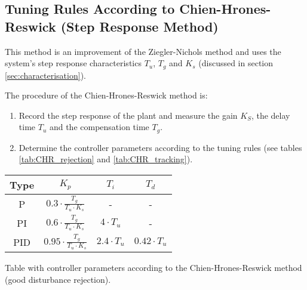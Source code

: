 \subsection{Tuning Rules According to Chien-Hrones-Reswick (Step Response Method)}

This  method is an improvement of the  Ziegler-Nichols  method  and  uses  the
system's step response characteristics $T_u$, $T_g$ and  $K_s$  (discussed  in
section \ref{sec:characterisation}).

The procedure of the Chien-Hrones-Reswick method is:

\begin{enumerate}
    \item Record the step response of the plant and measure the gain $K_{S}$, the delay time $T_{u}$ and the compensation time $T_{g}$.
    \item Determine the controller parameters according to the tuning rules (see tables \ref{tab:CHR_rejection} and \ref{tab:CHR_tracking}).
\end{enumerate}

\begin{center}
    \begin{threeparttable}
        \begin{tabular}{cccc}
            \toprule
            Type & $K_p$                                    &  $T_{i}$            &  $T_{d}$ \\
            \midrule
            P    &  $0.3   \cdot\frac{T_g}{T_u \cdot K_s}$  &  -                  &  -                  \\
            PI   &  $0.6   \cdot\frac{T_g}{T_u \cdot K_s}$  &  $4 \cdot T_u$      &  -                  \\
            PID  &  $0.95  \cdot\frac{T_g}{T_u \cdot K_s}$  &  $2.4 \cdot T_u$    &  $0.42 \cdot T_u$   \\
            \bottomrule
        \end{tabular}
        \caption{Table with controller parameters according to the Chien-Hrones-Reswick method (good disturbance rejection).}
        \label{tab:CHR_rejection}
    \end{threeparttable}
\end{center}

